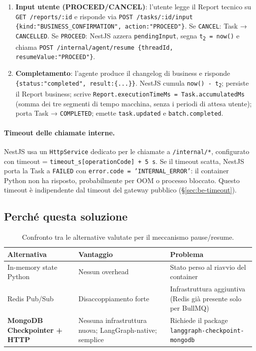 \documentclass[11pt,a4paper]{article}
\begin{document}
\begin{enumerate}
    \item \textbf{Input utente (PROCEED/CANCEL)}: l'utente legge il Report tecnico su \texttt{GET /reports/:id} e risponde via \texttt{POST /tasks/:id/input \{kind:"BUSINESS\_CONFIRMATION", action:"PROCEED"\}}. Se \texttt{CANCEL}: Task → \texttt{CANCELLED}. Se \texttt{PROCEED}: NestJS azzera \texttt{pendingInput}, segna \texttt{t\textsubscript{2} = now()} e chiama \texttt{POST /internal/agent/resume \{threadId, resumeValue:"PROCEED"\}}.

    \item \textbf{Completamento}: l'agente produce il changelog di business e risponde \texttt{\{status:"completed", result:\{...\}\}}. NestJS cumula \texttt{now() - t\textsubscript{2}}; persiste il Report business; scrive \texttt{Report.executionTimeMs = Task.accumulatedMs} (somma dei tre segmenti di tempo macchina, senza i periodi di attesa utente); porta Task → \texttt{COMPLETED}; emette \texttt{task.updated} e \texttt{batch.completed}.
\end{enumerate}

\paragraph{Timeout delle chiamate interne.} NestJS usa un \texttt{HttpService} dedicato per le chiamate a \texttt{/internal/*}, configurato con timeout = \texttt{timeout\_s[operationCode] + 5~s}. Se il timeout scatta, NestJS porta la Task a \texttt{FAILED} con \texttt{error.code = 'INTERNAL\_ERROR'}: il container Python non ha risposto, probabilmente per OOM o processo bloccato. Questo timeout è indipendente dal timeout del gateway pubblico (§\ref{sec:be-timeout}).

\subsection{Perché questa soluzione}

\begin{table}[H]
\centering
\caption{Confronto tra le alternative valutate per il meccanismo pause/resume.}
\label{tab:be-pause-resume}
\vspace{2mm}
\renewcommand{\arraystretch}{1.2}
\begin{tabularx}{\textwidth}{|l|X|X|}
\hline
\textbf{Alternativa} & \textbf{Vantaggio} & \textbf{Problema} \\ \hline
In-memory state Python & Nessun overhead & Stato perso al riavvio del container \\ \hline
Redis Pub/Sub & Disaccoppiamento forte & Infrastruttura aggiuntiva (Redis già presente solo per BullMQ) \\ \hline
\textbf{MongoDB Checkpointer + HTTP} & Nessuna infrastruttura nuova; LangGraph-native; semplice & Richiede il package \texttt{langgraph-checkpoint-mongodb} \\ \hline
\end{tabularx}
\end{table}
\end{document}
